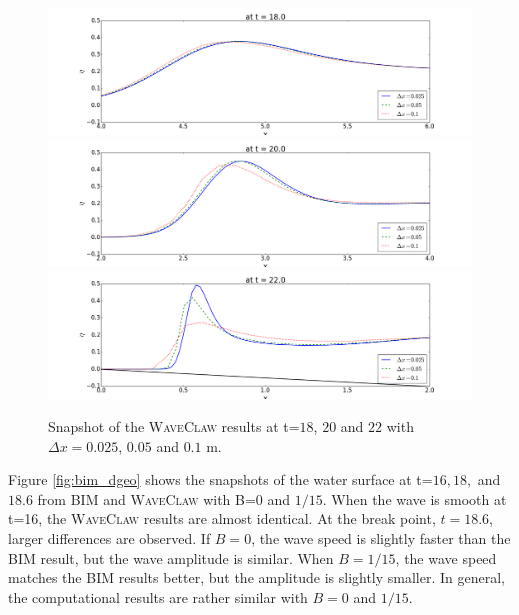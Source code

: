 \documentclass[review]{elsarticle}
\begin{document}
\begin{figure}[!htb]
\centering
\includegraphics[width=.9\textwidth]{_fig/dgeo_grids_t18.png}\\
\includegraphics[width=.9\textwidth]{_fig/dgeo_grids_t20.png}\\
\includegraphics[width=.9\textwidth]{_fig/dgeo_grids_t22.png}
\caption{Snapshot of the \textsc{WaveClaw} results 
at t=$18$, $20$ and $22$
with $\Delta x=0.025$, $0.05$ and $0.1$ m.}
\label{fig:dgeo_grids}
\end{figure}

\fi

Figure \ref{fig:bim_dgeo} shows the snapshots of 
the water surface at t=$16, 18,$ and $18.6$
from BIM and \textsc{WaveClaw} with B=$0$ and $1/15$.
When the wave is smooth at t=16, the \textsc{WaveClaw}
results are almost identical. 
At the break point, $t=18.6$, larger differences are observed. 
If $B=0$, the wave speed is slightly faster 
than the BIM result, but the wave amplitude is similar. 
When $B=1/15$, the wave speed matches the BIM results better,
but the amplitude is slightly smaller. 
In general, the computational results are rather similar
with $B=0$ and $1/15$. 
\end{document}
